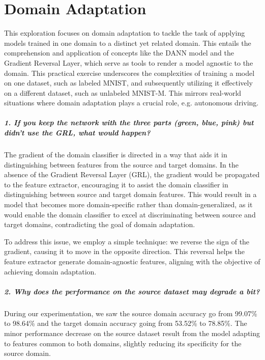 \chapter{Domain Adaptation}
\graphicspath{{figs/2c/}}

This exploration focuses on domain adaptation to tackle the task of applying models trained in one domain to a distinct yet related domain. This entails the comprehension and application of concepts like the DANN model and the Gradient Reversal Layer, which serve as tools to render a model agnostic to the domain. This practical exercise underscores the complexities of training a model on one dataset, such as labeled MNIST, and subsequently utilizing it effectively on a different dataset, such as unlabeled MNIST-M. This mirrors real-world situations where domain adaptation plays a crucial role, e.g. autonomous driving.

\paragraph*{1. If you keep the network with the three parts (green, blue, pink) but didn't use the GRL, what would happen?}

The gradient of the domain classifier is directed in a way that aids it in distinguishing between features from the source and target domains. In the absence of the Gradient Reversal Layer (GRL), the gradient would be propagated to the feature extractor, encouraging it to assist the domain classifier in distinguishing between source and target domain features. This would result in a model that becomes more domain-specific rather than domain-generalized, as it would enable the domain classifier to excel at discriminating between source and target domains, contradicting the goal of domain adaptation.

To address this issue, we employ a simple technique: we reverse the sign of the gradient, causing it to move in the opposite direction. This reversal helps the feature extractor generate domain-agnostic features, aligning with the objective of achieving domain adaptation.


\paragraph*{2. Why does the performance on the source dataset may degrade a bit?}

During our experimentation, we saw the source domain accuracy go from 99.07\% to 98.64\% and the target domain accuracy going from 53.52\% to 78.85\%. The minor performance decrease on the source dataset result from the model adapting to features common to both domains, slightly reducing its specificity for the source domain.

